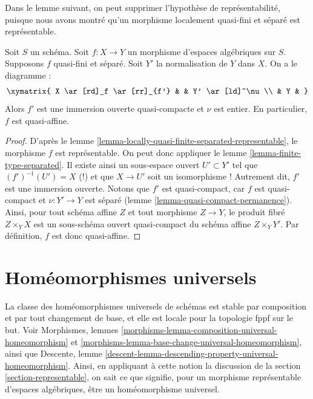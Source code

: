 \noindent
Dans le lemme suivant, on peut supprimer l'hypothèse de
représentabilité, puisque nous avons montré qu'un morphisme
localement quasi-fini et séparé est représentable.

\begin{lemma}
\label{lemma-quasi-finite-separated-quasi-affine}
Soit $S$ un schéma.
Soit $f : X \to Y$ un morphisme d'espaces algébriques sur $S$.
Supposons $f$ quasi-fini et séparé.
Soit $Y'$ la normalisation de $Y$ dans $X$.
On a le diagramme :
$$
\xymatrix{
X \ar[rd]_f \ar[rr]_{f'} & & Y' \ar[ld]^\nu \\
& Y &
}
$$
Alors $f'$ est une immersion ouverte quasi-compacte et $\nu$ est entier.
En particulier, $f$ est quasi-affine.
\end{lemma}

\begin{proof}
D'après le lemme \ref{lemma-locally-quasi-finite-separated-representable},
le morphisme $f$ est représentable. On peut donc appliquer le
lemme \ref{lemma-finite-type-separated}. Il existe ainsi un sous-espace
ouvert $U' \subset Y'$ tel que
$(f')^{-1}(U') = X$ (!) et que $X \to U'$ soit un isomorphisme ! Autrement
dit, $f'$ est une immersion ouverte. Notons que $f'$ est quasi-compact, car
$f$ est quasi-compact et $\nu : Y' \to Y$ est séparé
(lemme \ref{lemma-quasi-compact-permanence}).
Ainsi, pour tout schéma affine $Z$ et tout morphisme $Z \to Y$, le
produit fibré $Z \times_Y X$ est un sous-schéma ouvert quasi-compact
du schéma affine $Z \times_Y Y'$. Par définition, $f$ est donc
quasi-affine.
\end{proof}








\section{Homéomorphismes universels}
\label{section-universal-homeomorphisms}

\noindent
La classe des homéomorphismes universels de schémas est stable par
composition et par tout changement de base, et elle est locale pour la topologie fppf sur le but. Voir
Morphismes, lemmes
\ref{morphisms-lemma-composition-universal-homeomorphism} et
\ref{morphisms-lemma-base-change-universal-homeomorphism}, ainsi que
Descente, lemme \ref{descent-lemma-descending-property-universal-homeomorphism}.
Ainsi, en appliquant à cette notion la discussion de la
section \ref{section-representable},
on sait ce que signifie, pour un morphisme représentable
d'espaces algébriques, être un homéomorphisme universel.

